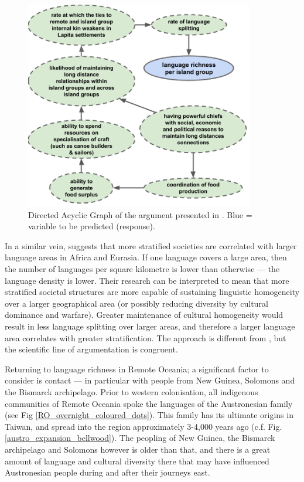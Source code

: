 \documentclass[a4paper,10pt]{article} %
\begin{document}
\begin{figure}[ht]
\centering
\includegraphics[width=10cm]{Predicting_lgs_DAG_andy.png}
\caption{Directed Acyclic Graph of the argument presented in \cite{pawley2007}. Blue = variable to be predicted (response).}
\label{Predicting_lgs_DAG_andy}
\end{figure}

In a similar vein, \citet{curriemace2009} suggests that more stratified societies are correlated with larger language areas in Africa and Eurasia. If one language covers a large area, then the number of languages per square kilometre is lower than otherwise --- the language density is lower. Their research can be interpreted to mean that more stratified societal structures are more capable of sustaining linguistic homogeneity over a larger geographical area (or possibly reducing diversity by cultural dominance and warfare). Greater maintenance of cultural homogeneity would result in less language splitting over larger areas, and therefore a larger language area correlates with greater stratification. The approach is different from \citet{pawley81, pawley2007}, but the scientific line of argumentation is congruent.

Returning to language richness in Remote Oceania; a significant factor to consider is contact --- in particular with people from New Guinea, Solomons and the Bismarck archipelago. Prior to western colonisation, all indigenous communities of Remote Oceania spoke the languages of the Austronesian family (see Fig \ref{RO_overnight_coloured_dots}). This family has its ultimate origins in Taiwan, and spread into the region approximately 3-4,000 years ago (c.f. Fig. \ref{austro_expansion_bellwood}). The peopling of New Guinea, the Bismarck archipelago and Solomons however is older than that, and there is a great amount of language and cultural diversity there that may have influenced Austronesian people during and after their journeys east. 
\end{document}
